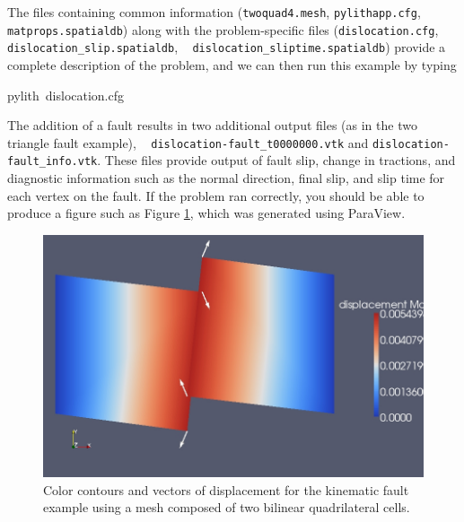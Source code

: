 The files containing common information (\texttt{twoquad4.mesh}, \texttt{pylithapp.cfg},
\texttt{matprops.spatialdb}) along with the problem-specific files
(\texttt{\small{}dislocation.cfg}{\small{}, }\texttt{\small{}dislocation\_slip.spatialdb}{\small{},
}\texttt{\small{}}~\linebreak{}
\texttt{\small{}dislocation\_sliptime.spatialdb}) provide a complete
description of the problem, and we can then run this example by typing
\begin{lyxcode}
pylith~dislocation.cfg
\end{lyxcode}
The addition of a fault results in two additional output files (as
in the two triangle fault example), \texttt{}~\linebreak{}
\texttt{dislocation-fault\_t0000000.vtk} and \texttt{dislocation-fault\_info.vtk}.
These files provide output of fault slip, change in tractions, and
diagnostic information such as the normal direction, final slip, and
slip time for each vertex on the fault. If the problem ran correctly,
you should be able to produce a figure such as Figure \ref{fig:twoquad4-disloc},
which was generated using ParaView.

\begin{figure}
\begin{centering}
\includegraphics[scale=0.33]{tutorials/twocells/figs/twoquad4-dislocation}
\par\end{centering}

\caption{Color contours and vectors of displacement for the kinematic fault
example using a mesh composed of two bilinear quadrilateral cells.\label{fig:twoquad4-disloc}}
\end{figure}



